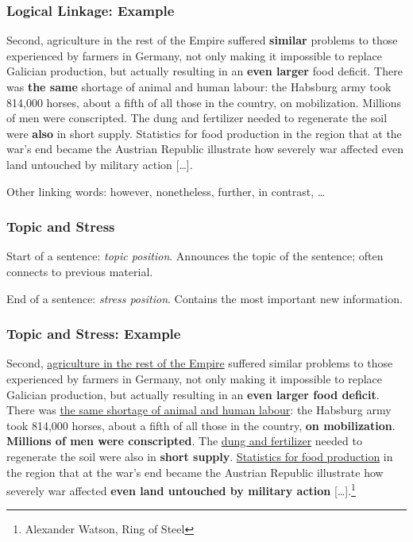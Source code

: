 \begin{frame}
  \frametitle{Logical Linkage: Example}

  {
  \small
  Second, agriculture in the rest of the Empire suffered \textbf{similar} problems to those experienced by farmers in Germany, not only making it impossible to replace Galician production, but actually resulting in an \textbf{even larger} food deficit.
  There was \textbf{the same} shortage of animal and human labour: the Habsburg army took 814,000 horses, about a fifth of all those in the country, on mobilization.
  Millions of men were conscripted.
  The dung and fertilizer needed to regenerate the soil were \textbf{also} in short supply.
  Statistics for food production in the region that at the war's end became the Austrian Republic illustrate how severely war affected even land untouched by military action [\dots].
  }

  \medskip

  Other linking words: however, nonetheless, further, in contrast, \dots
\end{frame}

\begin{frame}
  \frametitle{Topic and Stress}

  Start of a sentence: \emph{topic position}.
  Announces the topic of the sentence; often connects to previous material.

  \medskip

  End of a sentence: \emph{stress position}.
  Contains the most important new information.
\end{frame}

\begin{frame}
  \frametitle{Topic and Stress: Example}

  \small
  Second, \underline{agriculture in the rest of the Empire} suffered similar problems to those experienced by farmers in Germany, not only making it impossible to replace Galician production, but actually resulting in an \textbf{even larger food deficit}.
  There was \underline{the same shortage of animal and human labour}: the Habsburg army took 814,000 horses, about a fifth of all those in the country, \textbf{on mobilization}.
  \textbf{Millions of men were conscripted}.
  The \underline{dung and fertilizer} needed to regenerate the soil were also in \textbf{short supply}.
  \underline{Statistics for food production} in the region that at the war's end became the Austrian Republic illustrate how severely war affected \textbf{even land untouched by military action} [\dots].\footnote{Alexander Watson, Ring of Steel}
\end{frame}



